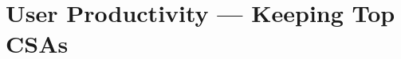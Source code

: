 \documentclass[11pt]{article}
\begin{document}
\section*{User Productivity — Keeping Top CSAs}

\end{document}
